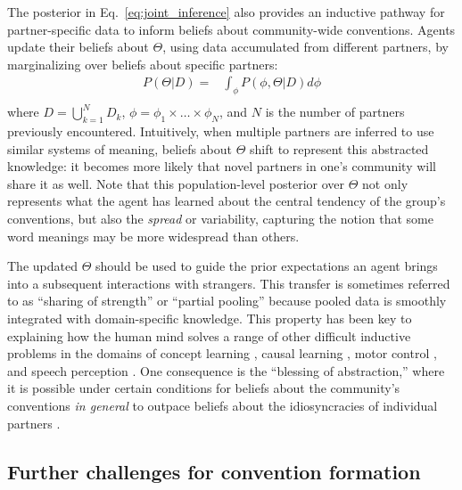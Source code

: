 The posterior in Eq.~\ref{eq:joint_inference} also provides an inductive pathway for partner-specific data to inform beliefs about community-wide conventions.
Agents update their beliefs about $\Theta$, using data accumulated from different partners, by marginalizing over beliefs about specific partners:
\begin{equation}
\begin{split}
    P(\Theta | D)  = & \int_{\phi} P(\phi, \Theta | D) d\phi \\
\end{split}
\end{equation}
where $D = \bigcup_{k=1}^N D_k$, $\phi = \phi_1 \times \dots \times \phi_N$, and $N$ is the number of partners previously encountered. 
Intuitively, when multiple partners are inferred to use similar systems of meaning, beliefs about $\Theta$ shift to represent this abstracted knowledge: it becomes more likely that novel partners in one's community will share it as well.
Note that this population-level posterior over $\Theta$ not only represents what the agent has learned about the central tendency of the group's conventions, but also the \emph{spread} or variability, capturing the notion that some word meanings may be more widespread than others.

The updated $\Theta$ should be used to guide the prior expectations an agent brings into a subsequent interactions with strangers.
This transfer is sometimes referred to as ``sharing of strength'' or ``partial pooling'' because pooled data is smoothly integrated with domain-specific knowledge.
This property has been key to explaining how the human mind solves a range of other difficult inductive problems in the domains of concept learning \cite{KempPerforsTenenbaum07_HBM, tenenbaum_how_2011}, causal learning \cite{KempPerforsTenenbaum07_HBM,KempGoodmanTenenbaum10_LearningToLearn},  motor control \cite{berniker2008estimating}, and speech perception \cite{kleinschmidt2015robust}.
One consequence is the ``blessing of abstraction,'' \cite{GoodmanUllmanTenenbaum11_TheoryOfCausality} where it is possible under certain conditions for beliefs about the community's conventions \emph{in general} to outpace beliefs about the idiosyncracies of individual partners \cite{gershman2017blessing}.

\subsection{Further challenges for convention formation}

